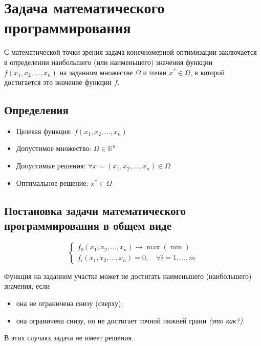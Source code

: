 \documentclass[17pt]{extarticle}
\begin{document}
\section{Задача математического программирования}

С математической точки зрения задача конечномерной оптимизации заключается в определении наибольшего (или наименьшего) значения функции \( f(x_1, x_2, \dots, x_n) \) на заданном множестве \( \Omega \) и точки \( x^* \in \Omega \), в которой достигается это значение функции \( f \).

\subsection{Определения}
\begin{itemize}
    \item Целевая функция: \( f(x_1, x_2, \dots, x_n) \)
    \item Допустимое множество: \( \Omega \in \mathbb{R}^{n} \)
    \item Допустимые решения: \( \forall x = (x_1, x_2, \dots, x_n) \in \Omega \)
    \item Оптимальное решение: \( x^* \in \Omega \)
\end{itemize}

\subsection{Постановка задачи математического программирования в общем виде}
\[
    \begin{cases}
        f_0(x_1, x_2, \dots, x_n) \to \max(\min) \\
        f_i(x_1, x_2, \dots, x_n) = 0, \quad \forall i = 1, \dots, m
    \end{cases}
\]

Функция на заданном участке может не достигать наименьшего (наибольшего) значения, если
\begin{itemize}
    \item она не ограничена снизу (сверху);
    \item она ограничена снизу, но не достигает точной нижней грани \textit{(это как?)}.
\end{itemize}

В этих случаях задача не имеет решения.
\end{document}
